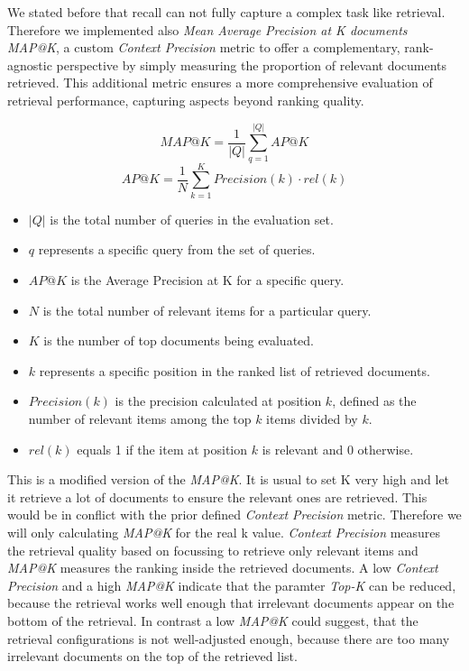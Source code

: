 We stated before that recall can not fully capture a complex task like retrieval. Therefore we implemented also \textit{Mean Average Precision at K documents MAP@K}, a custom \textit{Context Precision} metric to offer a complementary, rank-agnostic perspective by simply measuring the proportion of relevant documents retrieved. This additional metric ensures a more comprehensive evaluation of retrieval performance, capturing aspects beyond ranking quality.\cite{EvidentlyAIInc..25.02.2025} 

$$MAP@K=\frac{1}{|Q|}\sum_{q=1}^{|Q|}AP@K$$
$$AP@K=\frac{1}{N}\sum_{k=1}^{K}Precision(k) \cdot rel(k)$$
\begin{itemize}
  \item $|Q|$ is the total number of queries in the evaluation set.
  \item $q$ represents a specific query from the set of queries.
  \item $AP@K$ is the Average Precision at K for a specific query.
  \item $N$ is the total number of relevant items for a particular query.
  \item $K$ is the number of top documents being evaluated.
  \item $k$ represents a specific position in the ranked list of retrieved documents.
  \item $Precision(k)$ is the precision calculated at position $k$, defined as the number of relevant items among the top $k$ items divided by $k$.
  \item $rel(k)$ equals 1 if the item at position $k$ is relevant and 0 otherwise.
\end{itemize}

This is a modified version of the \textit{MAP@K}.\cite{Lin.13.10.2020} It is usual to set K very high and let it retrieve a lot of documents to ensure the relevant ones are retrieved. This would be in conflict with the prior defined \textit{Context Precision} metric. Therefore we will only calculating \textit{MAP@K} for the real k value. \textit{Context Precision} measures the retrieval quality based on focussing to retrieve only relevant items and \textit{MAP@K} measures the ranking inside the retrieved documents. A low \textit{Context Precision} and a high \textit{MAP@K} indicate that the paramter \textit{Top-K} can be reduced, because the retrieval works well enough that irrelevant documents appear on the bottom of the retrieval. In contrast a low \textit{MAP@K} could suggest, that the retrieval configurations is not well-adjusted enough, because there are too many irrelevant documents on the top of the retrieved list.

